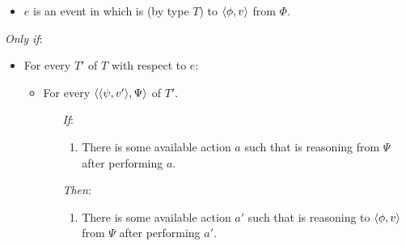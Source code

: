 \begin{note}
  \begin{definition}[\tR{2}]
    \label{def:cmptnc}

    \noindent%

    \begin{itemize}
    \item
      \(e\) is an event in which \vAgent{} is \emph{} (by type \(T\)) to \(\langle \phi, v \rangle\) from \(\Phi\).
    \end{itemize}

    \emph{Only if}:

    \begin{itemize}[noitemsep]
    \item
      For every  \(T'\) of \(T\) with respect to \(e\):
      \begin{itemize}[noitemsep]
      \item
        For every \tI{} \(\langle \langle \psi, v' \rangle, \Psi \rangle\) of \(T'\).
        \begin{itemize}[noitemsep]
        \item[\emph{If}:]
          \begin{enumerate}[label=\alph*., ref=(\alph*), series=tRSketch]
          \item
            There is some available action \(a\) such that \vAgent{} is reasoning from \(\Psi\) after performing \(a\).
          \end{enumerate}
        \item[\emph{Then}:]
          \begin{enumerate}[label=\alph*., ref=(\alph*), resume*=tRSketch]
          \item
            There is some available action \(a'\) such that \vAgent{} is reasoning to \(\langle \phi, v \rangle\) from \(\Psi\) after performing \(a'\).
          \end{enumerate}
        \end{itemize}
      \end{itemize}
    \end{itemize}
    \vspace{-\baselineskip}
  \end{definition}


\end{note}
